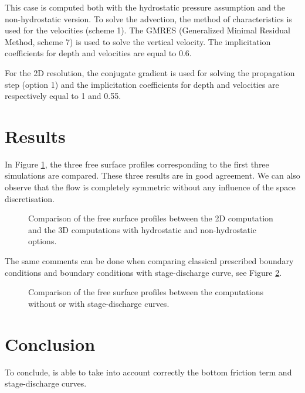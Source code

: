 \bigskip
This case is computed both with the hydrostatic pressure assumption and the non-hydrostatic version. 
To solve the advection, the method of characteristics
is used for the velocities (scheme 1). The GMRES 
(Generalized Minimal Residual Method, scheme 7) is used to solve 
the vertical velocity.  The implicitation coefficients 
for depth and velocities are equal to 0.6.

For the 2D resolution, the conjugate gradient
is used for solving the propagation step (option 1) and
the implicitation coefficients 
for depth and velocities are respectively equal to 1 and 0.55. 

\section{Results}

\bigskip
In Figure \ref{t3d:canal:fig:profiles}, the three free surface profiles
corresponding to the first three simulations are compared.
These three results are in good agreement.
We can also observe that the flow is completely symmetric without
any influence of the space discretisation.

\begin{figure}[!htbp]
 \centering
 \caption{Comparison of the free surface profiles between the 2D 
 computation  and the 3D computations 
 with hydrostatic and non-hydrostatic options. }
 \label{t3d:canal:fig:profiles}
 \end{figure}

The same comments can be done when comparing classical prescribed boundary
conditions and boundary conditions with stage-discharge curve,
see Figure \ref{t3d:canal:fig:profiles:sta-dis-cur}.

\begin{figure}[!htbp]
 \centering
 \caption{Comparison of the free surface profiles between the computations
 without or with stage-discharge curves.}
 \label{t3d:canal:fig:profiles:sta-dis-cur}
\end{figure}

\section{Conclusion}

To conclude,  is able to take into account correctly the bottom
friction term and stage-discharge curves.

